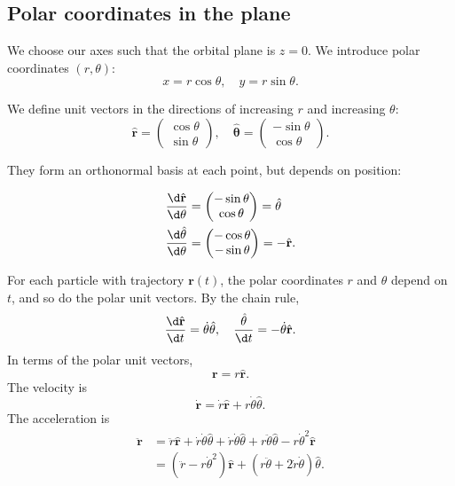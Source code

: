 \documentclass[a4paper]{article}
\begin{document}
\subsection{Polar coordinates in the plane}
We choose our axes such that the orbital plane is $z = 0$. We introduce polar coordinates $(r, \theta)$:
\[
  x = r\cos\theta, \quad y = r\sin \theta.
\]
\begin{notation}
  We define unit vectors in the directions of increasing $r$ and increasing $\theta$:
  \[
    \hat{\mathbf{r}} = \begin{pmatrix}\cos \theta\\ \sin \theta\end{pmatrix}, \quad \hat{\mathbf{\theta}} = \begin{pmatrix}-\sin \theta\\\cos\theta \end{pmatrix}.
  \]
  \begin{center}
  \end{center}
  They form an orthonormal basis at each point, but depends on position:
\end{notation}
\begin{prop}
  \begin{align*}
    \frac{\d \hat{\mathbf{r}}}{\d \theta} &= \begin{pmatrix} -\sin \theta\\ \cos \theta\end{pmatrix} = \hat{\theta}\\
    \frac{\d \hat{\theta}}{\d \theta} &= \begin{pmatrix}-\cos \theta\\ -\sin \theta\end{pmatrix} = -\hat{\mathbf{r}}.
  \end{align*}
\end{prop}

\begin{prop}
  For each particle with trajectory $\mathbf{r}(t)$, the polar coordinates $r$ and $\theta$ depend on $t$, and so do the polar unit vectors. By the chain rule,
  \[
    \frac{\d \hat{\mathbf{r}}}{\d t} = \dot{\theta}\hat{\theta},\quad \frac{\hat{\theta}}{\d t} = -\dot{\theta} \hat{\mathbf{r}}.
  \]
  In terms of the polar unit vectors, 
  \[
    \mathbf{r} = r\hat{\mathbf{r}}.
  \]
  The velocity is
  \[
    \dot{\mathbf{r}} = \dot{r} \hat{\mathbf{r}} + r\dot{\theta} \hat{\theta}.
  \]
  The acceleration is
  \begin{align*}
    \ddot{\mathbf{r}} &= \ddot{r} \hat{\mathbf{r}} + \dot{r}\dot{\theta}\hat{\theta} + \dot{r}\dot{\theta}\hat{\theta} + r\ddot{\theta}\hat{\theta} - r\dot{\theta}^2\hat{\mathbf{r}}\\
    &= (\ddot{r} - r\dot{\theta}^2)\hat{\mathbf{r}} + (r\ddot{\theta} + 2\dot{r}\dot{\theta})\hat{\theta}.
  \end{align*}
\end{prop}
\end{document}

